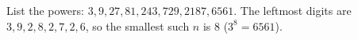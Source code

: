 List the powers: $3,9,27,81,243,729,2187,6561$. The leftmost digits are $3,9,2,8,2,7,2,6$, so the smallest such $n$ is $\boxed{8}$ ($3^8=6561$).
